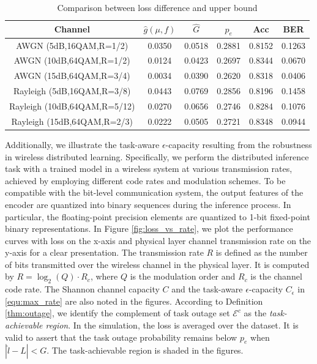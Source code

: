 \documentclass[lettersize,journal]{IEEEtran}
\theoremstyle{definition}
\theoremstyle{plain}
\begin{document}
\begin{table}[htbp]
  \caption{Comparison between loss difference and upper bound}
  \label{tab:comparison}
  \centering
  \begin{tabular}{| c | c | c | c | c | c |}
    \hline
    Channel & $\hat{g}(\mu,f)$ & $\hat{G}$ & $p_e$ & Acc & BER \\
    \hline
    AWGN (5dB,16QAM,R=1/2)      & 0.0350 & 0.0518 & 0.2881 & 0.8152 & 0.1263 \\ \hline %
    AWGN (10dB,64QAM,R=1/2)     & 0.0124 & 0.0423 & 0.2697 & 0.8344 & 0.0670 \\ \hline %
    AWGN (15dB,64QAM,R=3/4)     & 0.0034 & 0.0390 & 0.2620 & 0.8318 & 0.0406 \\  \hline %
    Rayleigh (5dB,16QAM,R=3/8)  & 0.0443 & 0.0769 & 0.2856 & 0.8196 & 0.1458 \\ \hline %
    Rayleigh (10dB,64QAM,R=5/12) & 0.0270 & 0.0656 & 0.2746 & 0.8284 & 0.1076 \\ \hline %
    Rayleigh (15dB,64QAM,R=2/3) & 0.0222 & 0.0505 & 0.2721 & 0.8348 & 0.0944 \\ \hline %
  \end{tabular}
\end{table}

Additionally, we illustrate the task-aware $\epsilon$-capacity resulting from the robustness in wireless distributed learning. 
Specifically, we perform the distributed inference task with a trained model in a wireless system at various transmission rates, achieved by employing different code rates and modulation schemes. To be compatible with the bit-level communication system, the output features of the encoder are quantized into binary sequences during the inference process. In particular, the floating-point precision elements are quantized to 1-bit fixed-point binary representations. 
In Figure \ref{fig:loss_vs_rate}, we plot the performance curves with loss on the x-axis and physical layer channel transmission rate on the y-axis for a clear presentation. 
The transmission rate $R$ is defined as the number of bits transmitted over the wireless channel in the physical layer. It is computed by $R=\log_2(Q)\cdot R_c$, where $Q$ is the modulation order and $R_c$ is the channel code rate.
The Shannon channel capacity $C$ and the task-aware $\epsilon$-capacity $C_\epsilon$ in \cref{equ:max_rate} are also noted in the figures. According to Definition \ref{thm:outage}, we identify the complement of task outage set $\mathcal{E}^c$ as the \textit{task-achievable region}. 
In the simulation, the loss is averaged over the dataset. It is valid to assert that the task outage probability remains below $p_e$ when $\left|\hat{l}-L\right|<G$. 
The task-achievable region is shaded in the figures.
\end{document}
